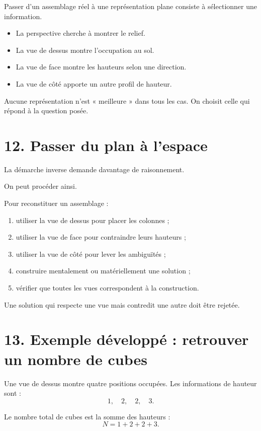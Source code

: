 Passer d'un assemblage réel à une représentation plane consiste à sélectionner une information.

\begin{itemize}
\item La perspective cherche à montrer le relief.
\item La vue de dessus montre l'occupation au sol.
\item La vue de face montre les hauteurs selon une direction.
\item La vue de côté apporte un autre profil de hauteur.
\end{itemize}

Aucune représentation n'est « meilleure » dans tous les cas. On choisit celle qui répond à la question posée.

\section{12. Passer du plan à l'espace}

La démarche inverse demande davantage de raisonnement.

On peut procéder ainsi.

\begin{methode}
Pour reconstituer un assemblage :
\begin{enumerate}
\item utiliser la vue de dessus pour placer les colonnes ;
\item utiliser la vue de face pour contraindre leurs hauteurs ;
\item utiliser la vue de côté pour lever les ambiguïtés ;
\item construire mentalement ou matériellement une solution ;
\item vérifier que toutes les vues correspondent à la construction.
\end{enumerate}
\end{methode}

Une solution qui respecte une vue mais contredit une autre doit être rejetée.

\section{13. Exemple développé : retrouver un nombre de cubes}

Une vue de dessus montre quatre positions occupées. Les informations de hauteur sont :
\[
1,\quad 2,\quad 2,\quad 3.
\]

Le nombre total de cubes est la somme des hauteurs :
\[
N=1+2+2+3.
\]

